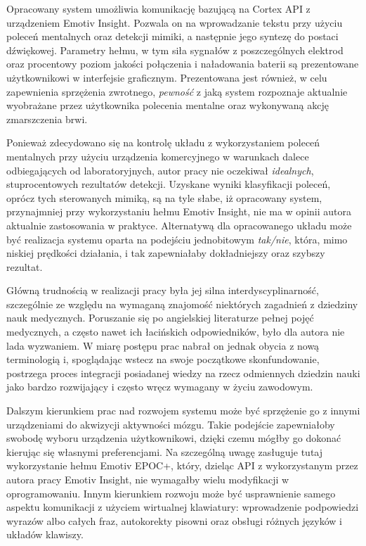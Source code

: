 \documentclass[skorowidz,skroty]{dyplomWEZUT}
\begin{document}
\FloatBarrier
\begin{zakonczenie}\label{chap:zakonczenie}
Opracowany system umożliwia komunikację bazującą na Cortex API z urządzeniem \linebreak Emotiv Insight. Pozwala on na wprowadzanie tekstu przy użyciu poleceń mentalnych oraz detekcji mimiki, a następnie jego syntezę do postaci dźwiękowej. Parametry hełmu, w tym siła sygnałów z poszczególnych elektrod oraz procentowy poziom jakości połączenia i naładowania baterii są prezentowane użytkownikowi w interfejsie graficznym. Prezentowana jest również, w celu zapewnienia sprzężenia zwrotnego, \textit{pewność} z jaką system rozpoznaje aktualnie wyobrażane przez użytkownika polecenia mentalne oraz wykonywaną akcję zmarszczenia brwi.

Ponieważ zdecydowano się na kontrolę układu z wykorzystaniem poleceń mentalnych przy użyciu urządzenia komercyjnego w warunkach dalece odbiegających od laboratoryjnych, autor pracy nie oczekiwał \textit{idealnych}, stuprocentowych rezultatów detekcji. Uzyskane wyniki klasyfikacji poleceń, oprócz tych sterowanych mimiką, są na tyle słabe, iż opracowany system, przynajmniej przy wykorzystaniu hełmu Emotiv Insight, nie ma w opinii autora aktualnie zastosowania w praktyce. Alternatywą dla opracowanego układu może być realizacja systemu oparta na podejściu jednobitowym \textit{tak/nie}, która, mimo niskiej prędkości działania, i tak zapewniałaby dokładniejszy oraz szybszy rezultat.

Główną trudnością w realizacji pracy była jej silna interdyscyplinarność, szczególnie ze względu na wymaganą znajomość niektórych zagadnień z dziedziny nauk medycznych. Poruszanie się po angielskiej literaturze pełnej pojęć medycznych, a często nawet ich łacińskich odpowiedników, było dla autora nie lada wyzwaniem. W miarę postępu prac nabrał on jednak obycia z nową terminologią i, spoglądając wstecz na swoje początkowe skonfundowanie, postrzega proces integracji posiadanej wiedzy na rzecz odmiennych dziedzin nauki jako bardzo rozwijający i często wręcz wymagany w życiu zawodowym.  

Dalszym kierunkiem prac nad rozwojem systemu może być sprzężenie go z innymi urządzeniami do akwizycji aktywności mózgu. Takie podejście zapewniałoby swobodę wyboru urządzenia użytkownikowi, dzięki czemu mógłby go dokonać kierując się własnymi preferencjami. Na szczególną uwagę zasługuje tutaj wykorzystanie hełmu Emotiv EPOC+, który, dzieląc API z wykorzystanym przez autora pracy Emotiv Insight, nie wymagałby wielu modyfikacji w oprogramowaniu. Innym kierunkiem rozwoju może być usprawnienie samego aspektu komunikacji z użyciem wirtualnej klawiatury: wprowadzenie podpowiedzi wyrazów albo całych fraz, autokorekty pisowni oraz obsługi różnych języków i układów klawiszy.
\end{zakonczenie}
\end{document}
